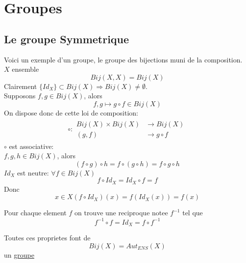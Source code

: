 \documentclass[../main.tex]{subfiles}
\begin{document}
\section{Groupes}
\subsection{Le groupe Symmetrique}
Voici un exemple d'un groupe, le groupe des bijections muni de la composition.\\
$X$ ensemble
\[ 
	Bij(X,X) = Bij(X)
\]
Clairement $\{ Id_X \} \subset Bij(X) \Rightarrow Bij(X) \neq \emptyset $.\\
Supposons $f,g \in Bij(X)$, alors
\[ 
	f,g \mapsto g \circ f \in Bij(X)
\]
On dispose donc de cette loi de composition:
\begin{align*}
\circ: 
\begin{aligned}
	Bij(X) \times Bij(X) &\longrightarrow Bij(X)\\
	( g,f) &\longrightarrow g \circ f
\end{aligned}
\end{align*}
 $\circ$ est associative:\\
 $f,g,h \in Bij(X)$, alors
 \[ 
	 ( f \circ g) \circ h = f \circ ( g \circ h) = f \circ g \circ h
 \]
 $Id_X$ est neutre: $\forall f \in Bij(X)$ 
 \[ 
	 f \circ Id_X = Id_X \circ f = f
 \]
Donc
\[ 
	x \in X (f \circ Id_X)(x) = f(Id_X(x)) = f(x)
\]

Pour chaque element $f$ on trouve une reciproque notee $f^{-1}$ tel que
\[ 
f^{-1} \circ f = Id_X= f \circ f^{-1}
\]

Toutes ces proprietes font de 
\[ 
	Bij(X) = Aut_{ENS}(X)
\]
un \underline{groupe}
\end{document}
